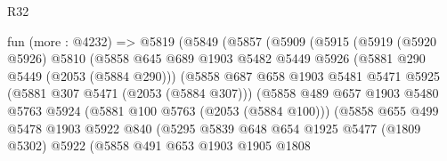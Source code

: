 \begin{lexlean}{R32}
\begin{coremodule}
                        fun (more : @4232) =>
                        @5819
                          (@5849
                            (@5857
                              (@5909
                                (@5915
                                  (@5919
                                    (@5920 @5926)
                                    @5810
                                    (@5858
                                      @645
                                      @689
                                      @1903
                                      @5482
                                      @5449
                                      @5926
                                      (@5881 @290 @5449 (@2053 (@5884 @290)))
                                      (@5858
                                        @687
                                        @658
                                        @1903
                                        @5481
                                        @5471
                                        @5925
                                        (@5881 @307 @5471 (@2053 (@5884 @307)))
                                        (@5858
                                          @489
                                          @657
                                          @1903
                                          @5480
                                          @5763
                                          @5924
                                          (@5881 @100 @5763 (@2053 (@5884 @100)))
                                          (@5858
                                            @655
                                            @499
                                            @5478
                                            @1903
                                            @5922
                                            @840
                                            (@5295
                                              @5839
                                              @648
                                              @654
                                              @1925
                                              @5477
                                              (@1809 @5302)
                                              @5922
                                              (@5858
                                                @491
                                                @653
                                                @1903
                                                @1905
                                                @1808

\end{coremodule}
\end{lexlean}
